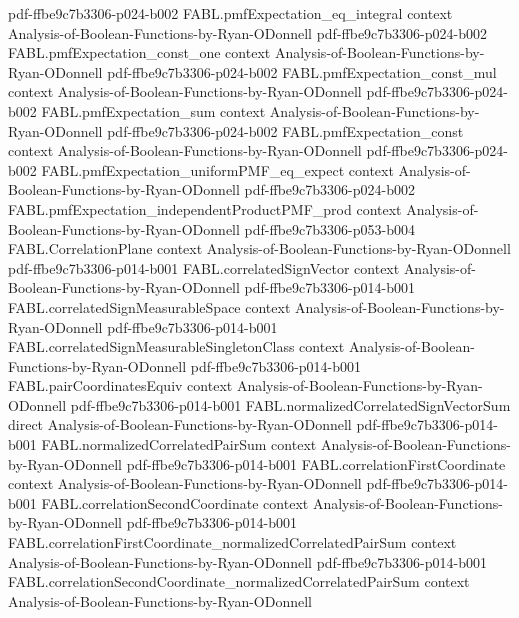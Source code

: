 \begin{theorem}
  {pdf-ffbe9c7b3306-p024-b002}
\proofstep
  {FABL.pmfExpectation_eq_integral}
  {context}
  {Analysis-of-Boolean-Functions-by-Ryan-ODonnell}
  {pdf-ffbe9c7b3306-p024-b002}
\proofstep
  {FABL.pmfExpectation_const_one}
  {context}
  {Analysis-of-Boolean-Functions-by-Ryan-ODonnell}
  {pdf-ffbe9c7b3306-p024-b002}
\proofstep
  {FABL.pmfExpectation_const_mul}
  {context}
  {Analysis-of-Boolean-Functions-by-Ryan-ODonnell}
  {pdf-ffbe9c7b3306-p024-b002}
\proofstep
  {FABL.pmfExpectation_sum}
  {context}
  {Analysis-of-Boolean-Functions-by-Ryan-ODonnell}
  {pdf-ffbe9c7b3306-p024-b002}
\proofstep
  {FABL.pmfExpectation_const}
  {context}
  {Analysis-of-Boolean-Functions-by-Ryan-ODonnell}
  {pdf-ffbe9c7b3306-p024-b002}
\proofstep
  {FABL.pmfExpectation_uniformPMF_eq_expect}
  {context}
  {Analysis-of-Boolean-Functions-by-Ryan-ODonnell}
  {pdf-ffbe9c7b3306-p024-b002}
\proofstep
  {FABL.pmfExpectation_independentProductPMF_prod}
  {context}
  {Analysis-of-Boolean-Functions-by-Ryan-ODonnell}
  {pdf-ffbe9c7b3306-p053-b004}
\proofstep
  {FABL.CorrelationPlane}
  {context}
  {Analysis-of-Boolean-Functions-by-Ryan-ODonnell}
  {pdf-ffbe9c7b3306-p014-b001}
\proofstep
  {FABL.correlatedSignVector}
  {context}
  {Analysis-of-Boolean-Functions-by-Ryan-ODonnell}
  {pdf-ffbe9c7b3306-p014-b001}
\proofstep
  {FABL.correlatedSignMeasurableSpace}
  {context}
  {Analysis-of-Boolean-Functions-by-Ryan-ODonnell}
  {pdf-ffbe9c7b3306-p014-b001}
\proofstep
  {FABL.correlatedSignMeasurableSingletonClass}
  {context}
  {Analysis-of-Boolean-Functions-by-Ryan-ODonnell}
  {pdf-ffbe9c7b3306-p014-b001}
\proofstep
  {FABL.pairCoordinatesEquiv}
  {context}
  {Analysis-of-Boolean-Functions-by-Ryan-ODonnell}
  {pdf-ffbe9c7b3306-p014-b001}
\proofstep
  {FABL.normalizedCorrelatedSignVectorSum}
  {direct}
  {Analysis-of-Boolean-Functions-by-Ryan-ODonnell}
  {pdf-ffbe9c7b3306-p014-b001}
\proofstep
  {FABL.normalizedCorrelatedPairSum}
  {context}
  {Analysis-of-Boolean-Functions-by-Ryan-ODonnell}
  {pdf-ffbe9c7b3306-p014-b001}
\proofstep
  {FABL.correlationFirstCoordinate}
  {context}
  {Analysis-of-Boolean-Functions-by-Ryan-ODonnell}
  {pdf-ffbe9c7b3306-p014-b001}
\proofstep
  {FABL.correlationSecondCoordinate}
  {context}
  {Analysis-of-Boolean-Functions-by-Ryan-ODonnell}
  {pdf-ffbe9c7b3306-p014-b001}
\proofstep
  {FABL.correlationFirstCoordinate_normalizedCorrelatedPairSum}
  {context}
  {Analysis-of-Boolean-Functions-by-Ryan-ODonnell}
  {pdf-ffbe9c7b3306-p014-b001}
\proofstep
  {FABL.correlationSecondCoordinate_normalizedCorrelatedPairSum}
  {context}
  {Analysis-of-Boolean-Functions-by-Ryan-ODonnell}

\end{theorem}
